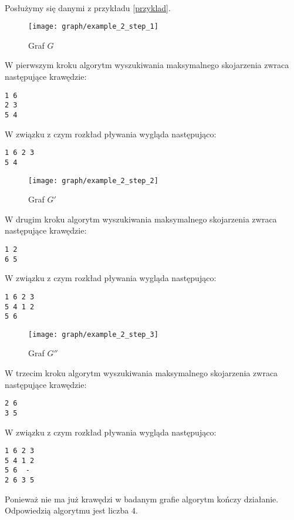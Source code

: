 \documentclass{llncs}
\begin{document}
\begin{example}~\\
Posłużymy się danymi z przykładu \ref{przyklad}.
\begin{figure}[H]
  \caption{Graf $G$}
  \centering
	\texttt{[image: graph/example\_2\_step\_1]}
\end{figure}
W pierwszym kroku algorytm wyszukiwania maksymalnego skojarzenia zwraca następujące krawędzie:
\begin{lstlisting}[title=Maksymalne skojarzenie grafu $G$]
1 6
2 3
5 4
\end{lstlisting}
W związku z czym rozkład pływania wygląda następująco:
\begin{lstlisting}[title=Rozkład plywania po kroku pierwszym]
1 6	2 3
5 4	
\end{lstlisting}
\begin{figure}[H]
  \caption{Graf $G'$}
  \centering
	\texttt{[image: graph/example\_2\_step\_2]}
\end{figure}
W drugim kroku algorytm wyszukiwania maksymalnego skojarzenia zwraca następujące krawędzie:
\begin{lstlisting}[title=Maksymalne skojarzenie grafu $G'$]
1 2
6 5
\end{lstlisting}
W związku z czym rozkład pływania wygląda następująco:
\begin{lstlisting}[title=Rozkład plywania po kroku drugim]
1 6	2 3
5 4	1 2
5 6
\end{lstlisting}
\begin{figure}[H]
  \caption{Graf $G''$}
  \centering
	\texttt{[image: graph/example\_2\_step\_3]}
\end{figure}
W trzecim kroku algorytm wyszukiwania maksymalnego skojarzenia zwraca następujące krawędzie:
\begin{lstlisting}[title=Maksymalne skojarzenie grafu $G''$]
2 6
3 5
\end{lstlisting}
W związku z czym rozkład pływania wygląda następująco:
\begin{lstlisting}[title=Rozkład plywania po kroku trzecim]
1 6	2 3
5 4	1 2
5 6	 -
2 6	3 5
\end{lstlisting}
Ponieważ nie ma już krawędzi w badanym grafie algorytm kończy działanie. Odpowiedzią algorytmu jest liczba $4$.
\end{example}
\end{document}

